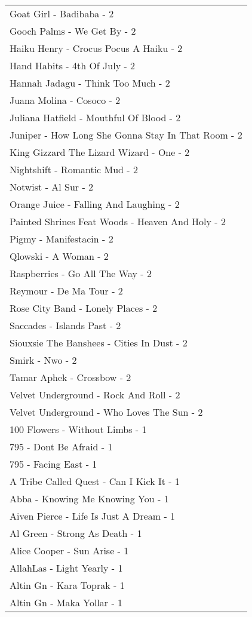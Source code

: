 \documentclass[
]{article}
\begin{document}
\begin{longtable}{l}
Goat Girl - Badibaba - 2 \\ 
Gooch Palms - We Get By - 2 \\ 
Haiku Henry - Crocus Pocus A Haiku - 2 \\ 
Hand Habits - 4th Of July - 2 \\ 
Hannah Jadagu - Think Too Much - 2 \\ 
Juana Molina - Cosoco - 2 \\ 
Juliana Hatfield - Mouthful Of Blood - 2 \\ 
Juniper - How Long She Gonna Stay In That Room - 2 \\ 
King Gizzard The Lizard Wizard - One - 2 \\ 
Nightshift - Romantic Mud - 2 \\ 
Notwist - Al Sur - 2 \\ 
Orange Juice - Falling And Laughing - 2 \\ 
Painted Shrines Feat Woods - Heaven And Holy - 2 \\ 
Pigmy - Manifestacin - 2 \\ 
Qlowski - A Woman - 2 \\ 
Raspberries - Go All The Way - 2 \\ 
Reymour - De Ma Tour - 2 \\ 
Rose City Band - Lonely Places - 2 \\ 
Saccades - Islands Past - 2 \\ 
Siouxsie The Banshees - Cities In Dust - 2 \\ 
Smirk - Nwo - 2 \\ 
Tamar Aphek - Crossbow - 2 \\ 
Velvet Underground - Rock And Roll - 2 \\ 
Velvet Underground - Who Loves The Sun - 2 \\ 
100 Flowers - Without Limbs - 1 \\ 
795 - Dont Be Afraid - 1 \\ 
795 - Facing East - 1 \\ 
A Tribe Called Quest - Can I Kick It - 1 \\ 
Abba - Knowing Me Knowing You - 1 \\ 
Aiven Pierce - Life Is Just A Dream - 1 \\ 
Al Green - Strong As Death - 1 \\ 
Alice Cooper - Sun Arise - 1 \\ 
AllahLas - Light Yearly - 1 \\ 
Altin Gn - Kara Toprak - 1 \\ 
Altin Gn - Maka Yollar - 1 \\ 

\end{longtable}
\end{document}
